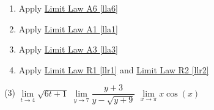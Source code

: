 \documentclass[10pt,oneside,]{book}
\theoremstyle{plain}
\theoremstyle{definition}
\numberwithin{equation}{section}
\begin{document}
\begin{multicols}{2}
\begin{enumerate}[label=(\alph*)]
\item{}Apply \hyperref[lla6]{Limit Law A6 \ref{lla6}}%
\item{}Apply \hyperref[lla1]{Limit Law A1 \ref{lla1}}%
\item{}Apply \hyperref[lla3]{Limit Law A3 \ref{lla3}}%
\item{}Apply \hyperref[llr1]{Limit Law R1 \ref{llr1}} and \hyperref[llr2]{Limit Law R2 \ref{llr2}}%
\end{enumerate}
\end{multicols}
\par
\begin{exercisegroup}(3)
\exercise[4.]\hypertarget{exercise-first-apply-limit-laws}{\null}\(\lim\limits_{t\to4}\sqrt{6t+1}\)%
\exercise[5.]\hypertarget{exercise-70}{\null}\(\lim\limits_{y\to7}\dfrac{y+3}{y-\sqrt{y+9}}\)%
\exercise[6.]\hypertarget{exercise-71}{\null}\(\lim\limits_{x\to\pi}x\cos(x)\)%
\end{exercisegroup}
\par\smallskip\noindent
\typeout{************************************************}
\typeout{************************************************}
\end{document}
